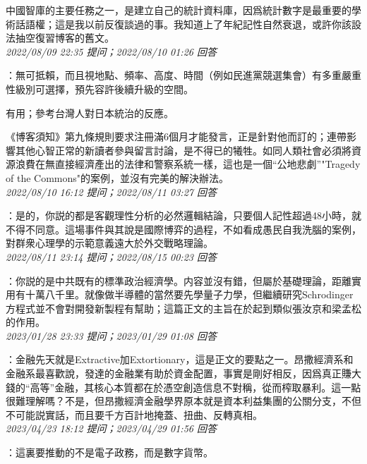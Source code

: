 \documentclass[twocolumn]{ctexart}
\begin{document}
中國智庫的主要任務之一，是建立自己的統計資料庫，因爲統計數字是最重要的學術話語權；這是我以前反復談過的事。我知道上了年紀記性自然衰退，或許你該設法抽空復習博客的舊文。
\\

\textit{\hfill\noindent\small 2022/08/09 22:35 提问；2022/08/10 01:26 回答}

：無可抵賴，而且視地點、頻率、高度、時間（例如民進黨競選集會）有多重嚴重性級別可選擇，預先容許後續升級的空間。

有用；參考台灣人對日本統治的反應。

《博客須知》第九條規則要求注冊滿6個月才能發言，正是針對他而訂的；連帶影響其他心智正常的新讀者參與留言討論，是不得已的犧牲。如同人類社會必須將資源浪費在無直接經濟產出的法律和警察系統一樣，這也是一個“公地悲劇”"Tragedy of the Commons"的案例，並沒有完美的解決辦法。
\\

\textit{\hfill\noindent\small 2022/08/10 16:12 提问；2022/08/11 03:27 回答}

：是的，你説的都是客觀理性分析的必然邏輯結論，只要個人記性超過48小時，就不得不同意。這場事件與其說是國際博弈的過程，不如看成愚民自我洗腦的案例，對群衆心理學的示範意義遠大於外交戰略理論。
\\

\textit{\hfill\noindent\small 2022/08/11 23:14 提问；2022/08/15 00:23 回答}

：你説的是中共既有的標準政治經濟學。内容並沒有錯，但屬於基礎理論，距離實用有十萬八千里。就像做半導體的當然要先學量子力學，但繼續研究Schrodinger方程式並不會對開發新製程有幫助；這篇正文的主旨在於起到類似張汝京和梁孟松的作用。
\\

\textit{\hfill\noindent\small 2023/01/28 23:33 提问；2023/01/29 01:08 回答}

：金融先天就是Extractive加Extortionary，這是正文的要點之一。昂撒經濟系和金融系最喜歡說，發達的金融業有助於資金配置，事實是剛好相反，因爲真正賺大錢的“高等”金融，其核心本質都在於憑空創造信息不對稱，從而榨取暴利。這一點很難理解嗎？不是，但昂撒經濟金融學界原本就是資本利益集團的公關分支，不但不可能説實話，而且要千方百計地掩蓋、扭曲、反轉真相。
\\

\textit{\hfill\noindent\small 2023/04/23 18:12 提问；2023/04/29 01:56 回答}

：這裏要推動的不是電子政務，而是數字貨幣。
\\
\end{document}
